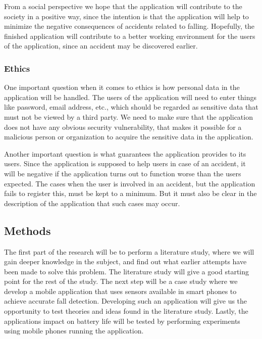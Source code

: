\documentclass[12pt, a4paper, onecolumn]{article}
\begin{document}
		From a social perspective we hope that the application will contribute to the society in a positive way, since the intention is that the application will help to minimize the negative consequences of accidents related to falling. Hopefully, the finished application will contribute to a better working environment for the users of the application, since an accident may be discovered earlier.  
		
		\subsubsection{Ethics}
		
		One important question when it comes to ethics is how personal data in the application will be handled. The users of the application will need to enter things like password, email address, etc., which should be regarded as sensitive data that must not be viewed by a third party. We need to make sure that the application does not have any obvious security vulnerability, that makes it possible for a malicious person or organization to acquire the sensitive data in the application.
		
		Another important question is what guarantees the application provides to its users. Since the application is supposed to help users in case of an accident, it will be negative if the application turns out to function worse than the users expected. The cases when the user is involved in an accident, but the application fails to register this, must be kept to a minimum. But it must also be clear in the description of the application that such cases may occur.
		
		\subsection{Methods}
		
		The first part of the research will be to perform a literature study, where we will gain deeper knowledge in the subject, and find out what earlier attempts have been made to solve this problem. The literature study will give a good starting point for the rest of the study. The next step will be a case study where we develop a mobile application that uses sensors available in smart phones to achieve accurate fall detection. Developing such an application will give us the opportunity to test theories and ideas found in the literature study. Lastly, the applications impact on battery life will be tested by performing experiments using mobile phones running the application.
		
\end{document}
